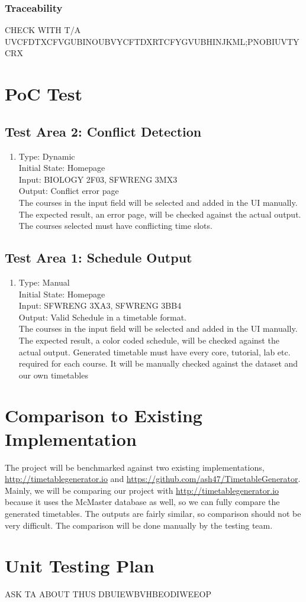 \documentclass[11pt, oneside]{article}   	%
\begin{document}
\subsubsection{Traceability}
CHECK WITH T/A UVCFDTXCFVGUBINOUBVYCFTDXRTCFYGVUBHINJKML;PNOBIUVTYCRX
\newpage

\section{PoC Test}

\subsection{Test Area 2: Conflict Detection}
\begin{enumerate}
\item Type: Dynamic \\
Initial State: Homepage \\
Input: BIOLOGY 2F03, SFWRENG 3MX3 \\
Output: Conflict error page \\
The courses in the input field will be selected and added in the UI manually. The expected result, an error page, will be checked against the actual output. The courses selected must have conflicting time slots. \\
\end{enumerate}

\subsection{Test Area 1: Schedule Output}
\begin{enumerate}
\item Type: Manual \\
Initial State: Homepage \\
Input: SFWRENG 3XA3, SFWRENG 3BB4 \\
Output: Valid Schedule in a timetable format. \\
The courses in the input field will be selected and added in the UI manually. The expected result, a color coded schedule, will be checked against the actual output. Generated timetable must have every core, tutorial, lab etc. required for each course. It will be manually checked against the dataset and our own timetables \\
\end{enumerate}

\section{Comparison to Existing Implementation}\label{sec:compare}
The project will be benchmarked against two existing implementations, \url{http://timetablegenerator.io} and \url{https://github.com/ash47/TimetableGenerator}. Mainly, we will be comparing our project with \url{http://timetablegenerator.io} because it uses the McMaster database as well, so we can fully compare the generated timetables. The outputs are fairly similar, so comparison should not be very difficult. The comparison will be done manually by the testing team.
\section{Unit Testing Plan}
ASK TA ABOUT THUS DBUIEWBVHBEODIWEEOP
\end{document}
